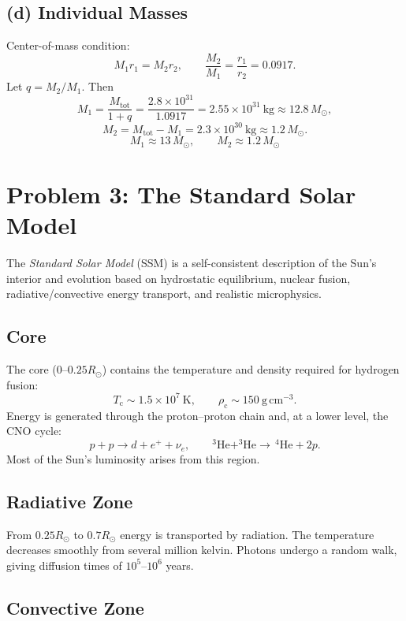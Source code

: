 \documentclass[12pt]{article}
\begin{document}
\subsection*{(d) Individual Masses}

Center-of-mass condition:
\[
M_{1}r_{1} = M_{2}r_{2},
\qquad
\frac{M_{2}}{M_{1}} = \frac{r_{1}}{r_{2}}
= 0.0917.
\]
Let $q = M_{2}/M_{1}$. Then
\[
M_{1} = \frac{M_{\mathrm{tot}}}{1+q}
= \frac{2.8\times 10^{31}}{1.0917}
= 2.55\times 10^{31}~\mathrm{kg}
\approx 12.8\,M_{\odot},
\]
\[
M_{2} = M_{\mathrm{tot}} - M_{1}
= 2.3\times 10^{30}~\mathrm{kg}
\approx 1.2\,M_{\odot}.
\]
\[
\boxed{M_{1} \approx 13\,M_{\odot}},\qquad
\boxed{M_{2} \approx 1.2\,M_{\odot}}
\]

\section*{Problem 3: The Standard Solar Model}

The \emph{Standard Solar Model} (SSM) is a self-consistent description of the Sun’s
interior and evolution based on hydrostatic equilibrium, nuclear fusion,
radiative/convective energy transport, and realistic microphysics.

\subsection*{Core}

The core ($0$--$0.25R_{\odot}$) contains the temperature and density required for
hydrogen fusion:
\[
T_{\mathrm{c}}\sim 1.5\times 10^{7}~\mathrm{K},\qquad
\rho_{\mathrm{c}}\sim 150~\mathrm{g\,cm^{-3}}.
\]
Energy is generated through the proton--proton chain and, at a lower level, the
CNO cycle:
\[
p + p \rightarrow d + e^{+} + \nu_{e},\qquad
^{3}\mathrm{He} + ^{3}\mathrm{He} \rightarrow \, ^{4}\mathrm{He} + 2p.
\]
Most of the Sun’s luminosity arises from this region.

\subsection*{Radiative Zone}

From $0.25R_{\odot}$ to $0.7R_{\odot}$ energy is transported by radiation.  The
temperature decreases smoothly from several million kelvin.  Photons undergo a
random walk, giving diffusion times of $10^{5}$--$10^{6}$ years.

\subsection*{Convective Zone}
\end{document}
